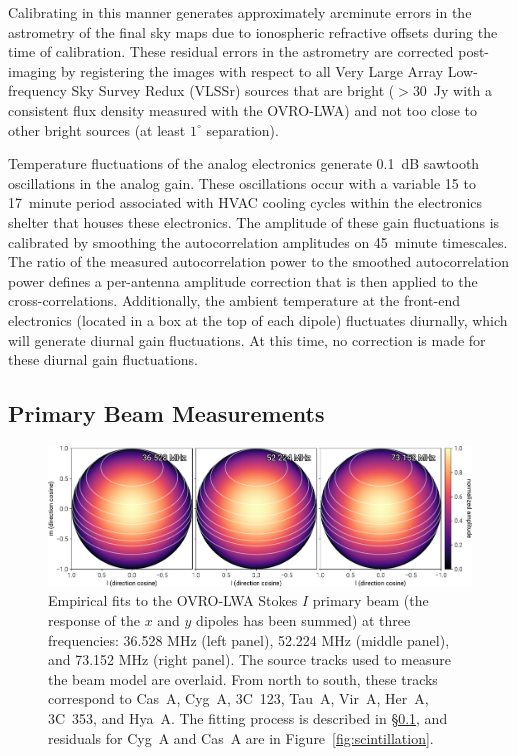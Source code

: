 \begin{bibunit}
Calibrating in this manner generates approximately arcminute errors in the astrometry of the final
sky maps due to ionospheric refractive offsets during the time of calibration.  These residual
errors in the astrometry are corrected post-imaging by registering the images with respect to all
Very Large Array Low-frequency Sky Survey Redux (VLSSr) \citep{2014MNRAS.440..327L} sources that are
bright ($>30$~Jy with a consistent flux density measured with the OVRO-LWA) and not too close to
other bright sources (at least $1^\circ$ separation).

Temperature fluctuations of the analog electronics generate 0.1~dB sawtooth oscillations in the
analog gain. These oscillations occur with a variable 15 to 17~minute period associated with HVAC
cooling cycles within the electronics shelter that houses these electronics.  The amplitude of these
gain fluctuations is calibrated by smoothing the autocorrelation amplitudes on 45~minute timescales.
The ratio of the measured autocorrelation power to the smoothed autocorrelation power defines a
per-antenna amplitude correction that is then applied to the cross-correlations.  Additionally, the
ambient temperature at the front-end electronics (located in a box at the top of each dipole)
fluctuates diurnally, which will generate diurnal gain fluctuations. At this time, no correction is
made for these diurnal gain fluctuations.

\subsection{Primary Beam Measurements}\label{sec:beam}

\begin{figure}[t]
    \includegraphics[width=\textwidth]{figures/chapter3/beam}
    \caption{
        Empirical fits to the OVRO-LWA Stokes $I$ primary beam (the response of the $x$ and
        $y$ dipoles has been summed) at three frequencies: 36.528 MHz (left panel), 52.224 MHz
        (middle panel), and 73.152 MHz (right panel). The source tracks used to measure the beam
        model are overlaid. From north to south, these tracks correspond to Cas~A, Cyg~A, 3C~123,
        Tau~A, Vir~A, Her~A, 3C~353, and Hya~A.  The fitting process is described in
        \S\ref{sec:beam}, and residuals for Cyg~A and Cas~A are in Figure~\ref{fig:scintillation}.
    }
    \label{fig:beam}
\end{figure}


\end{bibunit}
